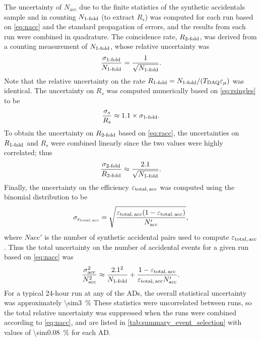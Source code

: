 The uncertainty of $N_{\text{acc}}$ due to the finite statistics
of the synthetic accidentals sample
and in counting $N_{\text{\ensuremath{1}-fold}}$ (to extract $R_s$)
was computed for each run based on \cref{eq:nacc}
and the standard propagation of errors,
and the results from each run were combined in quadrature.
The  coincidence rate, $R_\text{\ensuremath{2}-fold}$,
was derived from a counting measurement of $N_\text{\ensuremath{1}-fold}$,
whose relative uncertainty was
\begin{equation}\label{eq:sigma_1fold}
    \frac{\sigma_\text{\ensuremath{1}-fold}}{N_\text{\ensuremath{1}-fold}} =
    \frac{1}{\sqrt{N_\text{\ensuremath{1}-fold}}}.
\end{equation}
Note that the relative uncertainty on the rate
$R_\text{\ensuremath{1}-fold} = N_\text{\ensuremath{1}-fold}/(T_\text{DAQ}\varepsilon_\mu)$ was identical.
The uncertainty on $R_s$ was computed numerically
based on \cref{eq:rsingles} to be
\begin{equation}\label{eq:sigma_rs}
    \frac{\sigma_s}{R_s} \approx 1.1\times\sigma_\text{\ensuremath{1}-fold}.
\end{equation}
To obtain the uncertainty on $R_\text{\ensuremath{2}-fold}$ based on \cref{eq:racc},
the uncertainties on $R_\text{\ensuremath{1}-fold}$ and $R_s$ were combined linearly
since the two values were highly correlated; thus
\begin{equation}\label{eq:sigma_2fold}
    \frac{\sigma_\text{\ensuremath{2}-fold}}{R_\text{\ensuremath{2}-fold}} \approx
    \frac{2.1}{\sqrt{N_\text{\ensuremath{1}-fold}}}.
\end{equation}
Finally, the uncertainty on the efficiency $\varepsilon_\text{total,\,acc}$
was computed using the binomial distribution to be
\begin{equation}\label{eq:sigma_eps_acc}
    \sigma_{\varepsilon_\text{total,\,acc}} =
    \sqrt{
        \frac{
            \varepsilon_\text{total,\,acc} (1 - \varepsilon_\text{total,\,acc})
        }{N_\text{acc}'}
    },
\end{equation}
where $N\text{acc}'$ is the number of synthetic accidental pairs
used to compute $\varepsilon_\text{total,\,acc}$.
Thus the total uncertainty on the number of accidental events
for a given run based on \cref{eq:nacc} was
\begin{equation}\label{eq:sigma_acc}
    \frac{\sigma_\text{acc}^2}{N_\text{acc}^2} \approx
    \frac{2.1^2}{N_\text{\ensuremath{1}-fold}}
    + \frac{1-\varepsilon_\text{total,\,acc}}{
        \varepsilon_\text{total,\,acc} N_\text{acc}'
    }.
\end{equation}
For a typical 24-hour run at any of the ADs,
the overall statistical uncertainty was approximately \SI{\sim3}{\percent}
These statistics were uncorrelated between runs,
so the total relative uncertainty was suppressed
when the runs were combined according to \cref{eq:nacc},
and are listed in \cref{tab:summary_event_selection}
with values of \SI{\sim0.08}{\percent} for each AD.

